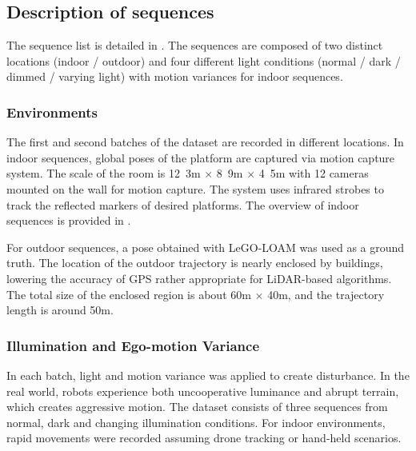 \subsection{Description of sequences}

The sequence list is detailed in . The sequences are
composed of two distinct locations (indoor / outdoor) and four different light
conditions (normal / dark / dimmed / varying light) with motion variances for
indoor sequences. 

\subsubsection{Environments}

The first and second batches of the dataset are recorded in different locations.
In indoor sequences, global poses of the platform are captured via motion
capture system. The scale of the room is \unit{12.3}{m} $\times$ \unit{8.9}{m}
$\times$ \unit{4.5}{m} with 12 cameras mounted on the wall for motion capture.
The system uses infrared strobes to track the reflected markers of desired
platforms. The overview of indoor sequences is provided in .

For outdoor sequences, a pose obtained with LeGO-LOAM \cite{legoloam2018} was used
as a ground truth. The location of the outdoor trajectory is nearly enclosed by
buildings, lowering the accuracy of \ac{GPS} rather appropriate for
LiDAR-based algorithms. The total size of the enclosed region is about
\unit{60}{m} $\times$ \unit{40}{m}, and the trajectory length is around
\unit{50}{m}.

\subsubsection{Illumination and Ego-motion Variance}

In each batch, light and motion variance was applied to create disturbance.
In the real world, robots experience both uncooperative luminance and abrupt
terrain, which creates aggressive motion. The dataset consists of three
sequences from normal, dark and changing illumination conditions. For indoor
environments, rapid movements were recorded assuming drone tracking or hand-held
scenarios.



